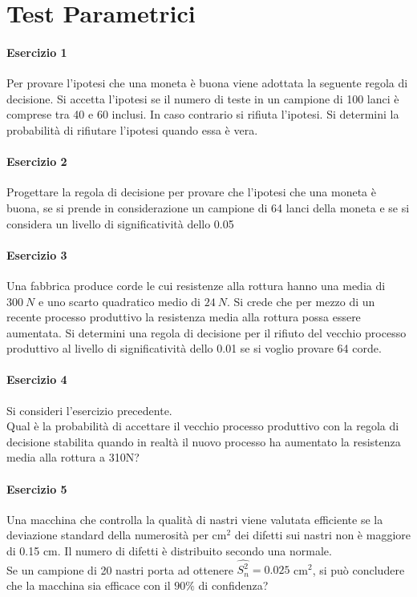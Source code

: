 \documentclass[12pt]{article}
\begin{document}
    \section{Test Parametrici}
    \paragraph{Esercizio 1} Per provare l’ipotesi che una moneta è buona viene adottata la seguente regola di decisione.
    Si accetta l’ipotesi se il numero di teste in un campione di 100 lanci è comprese tra 40 e 60 inclusi. In caso contrario si rifiuta l’ipotesi.
    Si determini la probabilità di rifiutare l’ipotesi quando essa è vera.
    \paragraph{Esercizio 2}
    Progettare la regola di decisione per provare che l’ipotesi che una moneta è buona, se si prende in considerazione un campione di 64 lanci della moneta e se si considera un livello di significatività dello 0.05
    \paragraph{Esercizio 3}
    Una fabbrica produce corde le cui resistenze alla rottura hanno una media di $300 \ N$ e uno scarto quadratico medio di $24 \ N$. Si crede che per mezzo di un recente processo produttivo la resistenza media alla rottura possa essere aumentata. Si determini una regola di decisione per il rifiuto del vecchio processo produttivo al livello di significatività dello 0.01 se si voglio provare 64 corde.
    \paragraph{Esercizio 4}
    Si consideri l’esercizio precedente.
    \\Qual è la probabilità di accettare il vecchio processo produttivo con la regola di decisione stabilita quando in realtà il nuovo processo ha aumentato la resistenza media alla rottura a 310N?
    \paragraph{Esercizio 5}
    Una macchina che controlla la qualità di nastri viene valutata efficiente se la deviazione standard della numerosità per cm$^2$ dei difetti sui nastri non è maggiore di 0.15 cm. Il numero di difetti è distribuito secondo una normale.
    \\Se un campione di 20 nastri porta ad ottenere $\hat{S^2_n} = 0.025$ cm$^2$, si può concludere che la macchina sia efficace con il $90\%$ di confidenza?
    \newpage
\end{document}
